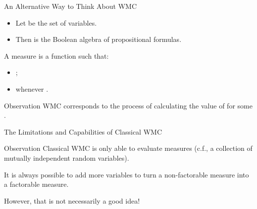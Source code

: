 \documentclass{beamer}
\begin{document}
\begin{frame}{An Alternative Way to Think About WMC}
  \begin{itemize}
  \item Let  be the set of variables.
  \item Then  is the Boolean algebra of propositional
    formulas.
  \end{itemize}
  \begin{definition}
    A \alert{measure} is a function  such that:
    \begin{itemize}
    \item {};
    \item {} whenever .
    \end{itemize}
  \end{definition}
  \begin{block}{Observation}
    WMC corresponds to the process of calculating the value of
     for some .
  \end{block}
\end{frame}


\begin{frame}{The Limitations and Capabilities of Classical WMC}
  \begin{alertblock}{Observation}
    Classical WMC is only able to evaluate  measures
    (c.f., a collection of mutually independent random variables).
  \end{alertblock}
  \begin{theorem}
    It is always possible to add more variables to turn a non-factorable measure
    into a factorable measure.
  \end{theorem}
  However, that is not necessarily a good idea!
\end{frame}
\end{document}
